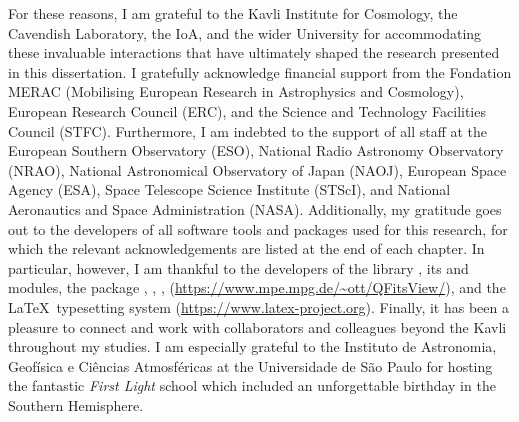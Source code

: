 \begin{acknowledgements}
    For these reasons, I am grateful to the Kavli Institute for Cosmology, the Cavendish Laboratory, the IoA, and the wider University for accommodating these invaluable interactions that have ultimately shaped the research presented in this dissertation. I gratefully acknowledge financial support from the Fondation MERAC (Mobilising European Research in Astrophysics and Cosmology), European Research Council (ERC), and the Science and Technology Facilities Council (STFC). Furthermore, I am indebted to the support of all staff at the European Southern Observatory (ESO), National Radio Astronomy Observatory (NRAO), National Astronomical Observatory of Japan (NAOJ), European Space Agency (ESA), Space Telescope Science Institute (STScI), and National Aeronautics and Space Administration (NASA). Additionally, my gratitude goes out to the developers of all software tools and packages used for this research, for which the relevant acknowledgements are listed at the end of each chapter. In particular, however, I am thankful to the developers of the  library \citep{Jones2001}, its  \citep{2011CSE....13b..22V} and  \citep{Hunter2007} modules, the  package \citep{2013A&A...558A..33A, 2018AJ....156..123A},  \citep{2003ASPC..295..489J},  \citep[Tool for OPerations on Catalogues And Tables;][]{2005ASPC..347...29T},  (\url{https://www.mpe.mpg.de/~ott/QFitsView/}), and the \LaTeX\ typesetting system (\url{https://www.latex-project.org}). Finally, it has been a pleasure to connect and work with collaborators and colleagues beyond the Kavli throughout my studies. I am especially grateful to the Instituto de Astronomia, Geof{\'i}sica e Ci{\^e}ncias Atmosf{\'e}ricas at the Universidade de S{\~a}o Paulo for hosting the fantastic \textit{First Light} school which included an unforgettable birthday in the Southern Hemisphere.
    

\end{acknowledgements}
